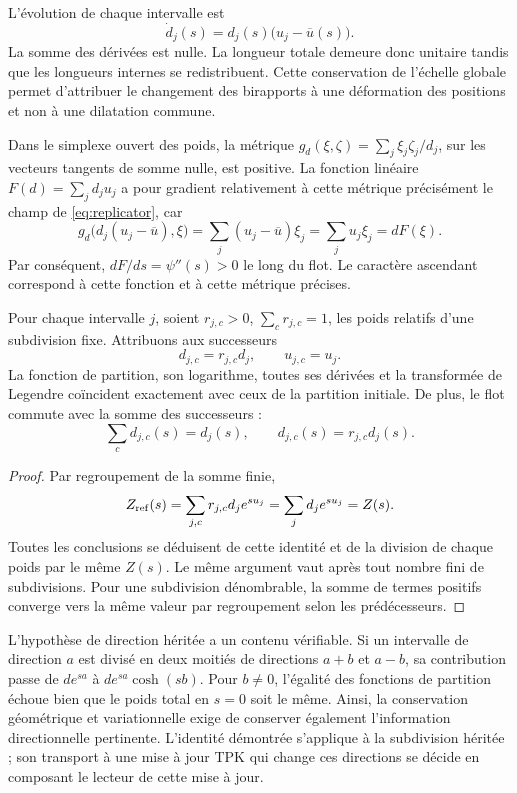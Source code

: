 L’évolution de chaque intervalle est
\begin{equation}
 \dot d_j(s)=d_j(s)\bigl(u_j-\overline u(s)\bigr).
 \label{eq:replicator}
\end{equation}
La somme des dérivées est nulle. La longueur totale demeure donc
unitaire tandis que les longueurs internes se redistribuent. Cette conservation
de l’échelle globale permet d’attribuer le changement des birapports à une
déformation des positions et non à une dilatation commune.

Dans le simplexe ouvert des poids, la métrique
\(g_d(\xi,\zeta)=\sum_j\xi_j\zeta_j/d_j\), sur les vecteurs tangents
de somme nulle, est positive. La fonction linéaire
\(F(d)=\sum_jd_ju_j\) a pour gradient relativement à cette métrique
précisément le champ de \eqref{eq:replicator}, car
\[
 g_d\bigl(d_j(u_j-\overline u),\xi\bigr)
 =\sum_j(u_j-\overline u)\xi_j=\sum_ju_j\xi_j=dF(\xi).
\]
Par conséquent, \(dF/ds=\psi''(s)>0\) le long du flot. Le
caractère ascendant correspond à cette fonction et à cette métrique précises.

\begin{theorem}
Pour chaque intervalle \(j\), soient \(r_{j,c}>0\), \(\sum_c r_{j,c}=1\), les poids relatifs d'une subdivision fixe. Attribuons aux successeurs
\[
 d_{j,c}=r_{j,c}d_j,\qquad u_{j,c}=u_j.
\]
La fonction de partition, son logarithme, toutes ses dérivées et la transformée de Legendre coïncident exactement avec ceux de la partition initiale. De plus, le flot commute avec la somme des successeurs :
\[
 \sum_c d_{j,c}(s)=d_j(s),\qquad
 d_{j,c}(s)=r_{j,c}d_j(s).
\]
\end{theorem}
\begin{proof}
Par regroupement de la somme finie,
\[
 Z_{\rm ref}(s)=\sum_{j,c}r_{j,c}d_j e^{su_j}
 =\sum_j d_j e^{su_j}=Z(s).
\]
Toutes les conclusions se déduisent de cette identité et de la division de chaque poids par le même \(Z(s)\). Le même argument vaut après tout nombre fini de subdivisions. Pour une subdivision dénombrable, la somme de termes positifs converge vers la même valeur par regroupement selon les prédécesseurs.
\end{proof}

L'hypothèse de direction héritée a un contenu vérifiable. Si un intervalle de direction \(a\) est divisé en deux moitiés de directions \(a+b\) et \(a-b\), sa contribution passe de \(d e^{sa}\) à \(d e^{sa}\cosh(sb)\). Pour \(b\ne0\), l'égalité des fonctions de partition échoue bien que le poids total en \(s=0\) soit le même. Ainsi, la conservation géométrique et variationnelle exige de conserver également l'information directionnelle pertinente. L'identité démontrée s'applique à la subdivision héritée ; son transport à une mise à jour TPK qui change ces directions se décide en composant le lecteur de cette mise à jour.

